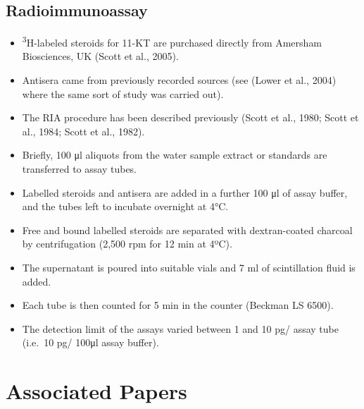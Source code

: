 \documentclass[
  letterpaper,
  DIV=11,
  numbers=noendperiod]{scrreprt}
\providecommand{\tightlist}{%
  \setlength{\itemsep}{0pt}\setlength{\parskip}{0pt}}\usepackage{longtable,booktabs,array}
\begin{document}
\hypertarget{radioimmunoassay}{%
\subsection{Radioimmunoassay}\label{radioimmunoassay}}

\begin{itemize}
\tightlist
\item
  \textsuperscript{3}H-labeled steroids for 11-KT are purchased directly
  from Amersham Biosciences, UK (Scott et al., 2005).
\item
  Antisera came from previously recorded sources (see (Lower et al.,
  2004) where the same sort of study was carried out).
\item
  The RIA procedure has been described previously (Scott et al., 1980;
  Scott et al., 1984; Scott et al., 1982).
\item
  Briefly, 100 μl aliquots from the water sample extract or standards
  are transferred to assay tubes.
\item
  Labelled steroids and antisera are added in a further 100 μl of assay
  buffer, and the tubes left to incubate overnight at 4°C.
\item
  Free and bound labelled steroids are separated with dextran-coated
  charcoal by centrifugation (2,500 rpm for 12 min at 4ºC).
\item
  The supernatant is poured into suitable vials and 7 ml of
  scintillation fluid is added.
\item
  Each tube is then counted for 5 min in the counter (Beckman LS 6500).
\item
  The detection limit of the assays varied between 1 and 10 pg/ assay
  tube (i.e.~10 pg/ 100μl assay buffer).
\end{itemize}

\hypertarget{associated-papers-36}{%
\section{Associated Papers}\label{associated-papers-36}}
\end{document}
